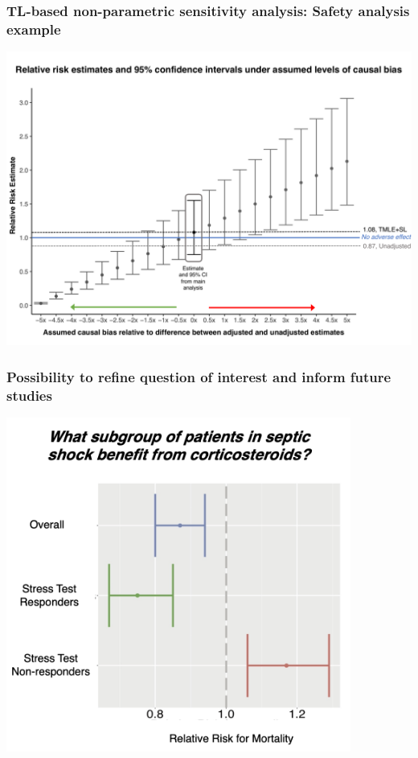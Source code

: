 \documentclass[t]{beamer}
\begin{document}
\begin{frame}
\frametitle{TL-based non-parametric sensitivity analysis: Safety analysis example}

\vspace{-18pt}
  \begin{center}
  \includegraphics[width = 1.01\textwidth]{figures/sensitivityRR_greyscale.pdf}
  \end{center}
\end{frame}

\begin{frame}
  \frametitle{Possibility to refine question of interest and inform future studies}
  \vspace{-11pt}
  \begin{center}
  \includegraphics[width = 0.85\textwidth]{figures/subgroup.png}
  \end{center}
\end{frame}
\end{document}
